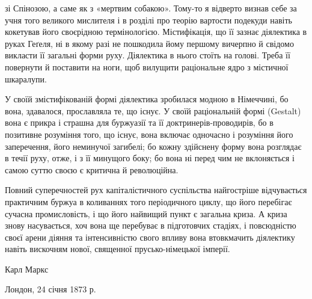 \parcont{}  %
зі Спінозою, а саме як з «мертвим собакою». Тому-то я відверто
визнав себе за учня того великого мислителя і в розділі про теорію
вартости подекуди навіть кокетував його своєрідною термінологією.
Містифікація, що її зазнає діялектика в руках Геґеля, ні в
якому разі не пошкодила йому першому вичерпно й свідомо викласти
її загальні форми руху. Діялектика в нього стоїть на голові.
Треба її повернути й поставити на ноги, щоб вилущити раціональне
ядро з містичної шкаралупи.

У своїй змістифікованій формі діялектика зробилася модною
в Німеччині, бо вона, здавалося, прославляла те, що існує.
У своїй раціональній формі (Gestalt) вона є прикра і страшна для
буржуазії та її доктринерів-проводирів, бо в позитивне розуміння
того, що існує, вона включає одночасно і розуміння його
заперечення, його неминучої загибелі; бо кожну здійснену форму
вона розглядає в течії руху, отже, і з її минущого боку; бо вона
ні перед чим не вклоняється і самою суттю своєю є критична
й революційна.

Повний суперечностей рух капіталістичного суспільства найгостріше
відчувається практичним буржуа в коливаннях того періодичного
циклу, що його перебігає сучасна промисловість, і що
його найвищий пункт є загальна криза. А криза знову насувається,
хоч вона ще перебуває в підготовчих стадіях, і повсюдністю
своєї арени діяння та інтенсивністю свого впливу вона
втовкмачить діялектику навіть вискочням нової, священної прусько-німецької
імперії.

Карл Маркс

Лондон, 24 січня 1873 р.
